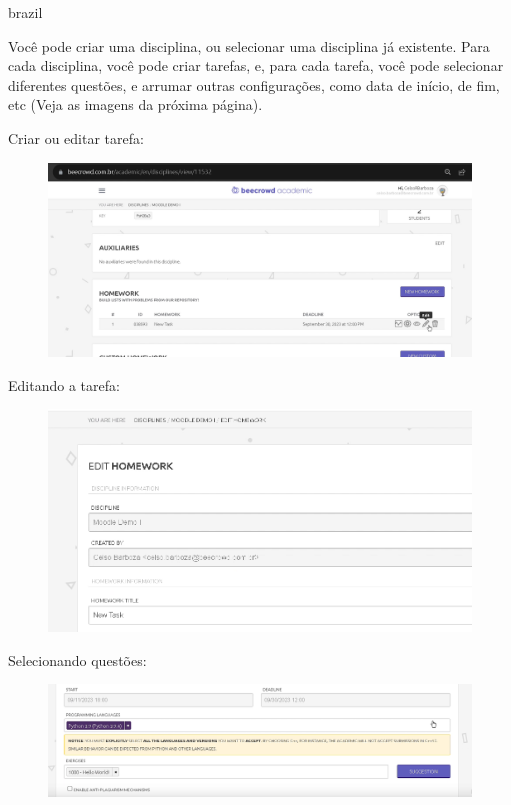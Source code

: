 \begin{otherlanguage*}{brazil}
\begin{enumerate}
    Você pode criar uma disciplina, ou selecionar uma disciplina já existente. Para cada disciplina, você pode criar tarefas, e, para cada tarefa, você pode selecionar diferentes questões, e arrumar outras configurações, como data de início, de fim, etc (Veja as imagens da próxima página).

    Criar ou editar tarefa:

    \begin{figure}[H]
        \centering
            \includegraphics[scale=0.3]{pictures/apendices/apendice_b_7.png}
    \end{figure}

    Editando a tarefa:

    \begin{figure}[H]
        \centering
            \includegraphics[scale=0.4]{pictures/apendices/apendice_b_8.png}
    \end{figure}

    Selecionando questões:

    \begin{figure}[H]
        \centering
            \includegraphics[scale=0.3]{pictures/apendices/apendice_b_9.png}
    \end{figure}
    

\end{enumerate}
\end{otherlanguage*}
